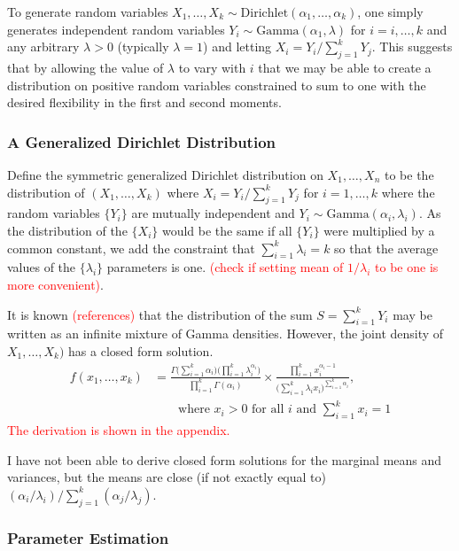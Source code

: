 \documentclass[useAMS,usenatbib]{biom}
\newcommand{\falta}[1]{\textcolor{red}{#1}}
\begin{document}
To generate random variables $X_1,\ldots,X_k \sim
\text{Dirichlet}(\alpha_1,\ldots,\alpha_k)$, one simply generates
independent random variables $Y_i \sim \text{Gamma}(\alpha_1,\lambda)$
for $i=i,\ldots,k$ and any arbitrary $\lambda>0$ (typically
$\lambda=1$) and letting $X_i = Y_i / \sum_{j=1}^k Y_j$.  This
suggests that by allowing the value of $\lambda$ to vary with $i$ that
we may be able to create a distribution on positive random variables
constrained to sum to one with the desired flexibility in the first
and second moments.

\subsubsection{A Generalized Dirichlet Distribution}

Define the symmetric generalized Dirichlet distribution on
$X_1,\ldots,X_n$ to be the distribution of $(X_1,\ldots,X_k)$ where
$X_i = Y_i \big/ \sum_{j=1}^k Y_j$ for $i=1,\ldots,k$ where the random
variables $\{Y_i\}$ are mutually independent and $Y_i \sim
\text{Gamma}(\alpha_i,\lambda_i)$.  As the distribution of the
$\{X_i\}$ would be the same if all $\{Y_i\}$ were multiplied by a
common constant, we add the constraint that $\sum_{i=1}^k \lambda_i =
k$ so that the average values of the $\{\lambda_i\}$ parameters is
one.  \falta{(check if setting mean of $1/\lambda_i$ to be one is more
  convenient)}.

It is known \falta{(references)} that the distribution of the sum $S =
\sum_{i=1}^k Y_i$ may be written as an infinite mixture of Gamma
densities.  However, the joint density of $X_1,\ldots,X_k)$ has a
closed form solution.
\begin{eqnarray*}
  f(x_1,\ldots,x_k) &= \frac{\Gamma\big(\sum_{i=1}^k
    \alpha_i\big)\big(\prod_{i=1}^k
    \lambda_i^{\alpha_i}\big)}{\prod_{i=1}^k \Gamma(\alpha_i)}
  \times \frac{\prod_{i=1}^k x_i^{\alpha_i - 1}}{\big(\sum_{i=1}^k
    \lambda_i x_i\big)^{\sum_{i=1}^k \alpha_i}},\\ 
  & \qquad \text{where
    $x_i > 0$ for all $i$ and $\sum_{i=1}^k x_i = 1$}
\end{eqnarray*}
\falta{The derivation is shown in the appendix.}

I have not been able to derive closed form solutions for the marginal
means and variances, but the means are close (if not exactly equal to)
$(\alpha_i/\lambda_i) \big/ \sum_{j=1}^k (\alpha_j/\lambda_j)$.

\subsubsection{Parameter Estimation}
\end{document}
